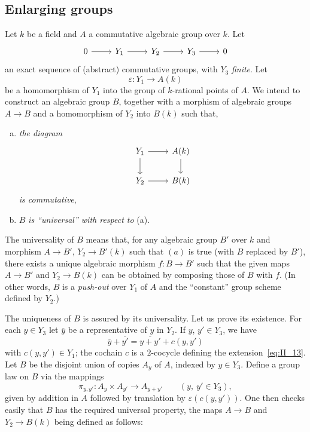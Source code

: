\subsection{Enlarging groups}
\label{sec:II_13}
Let $k$ be a field and $A$ a commutative algebraic group over $k$. Let
\begin{equation}\label{eq:II_13}
	\begin{tikzcd}
		0 \arrow[r] & Y_1 \arrow[r] & Y_2 \arrow[r] & Y_3 \arrow[r] & 0
	\end{tikzcd}
\end{equation}
an exact sequence of (abstract) commutative groups, with $Y_3$ \emph{finite}.
Let
\[
\varepsilon : Y_1 \rightarrow A(k)
\]
be a homomorphism of $Y_1$ into the group of $k$-rational points of $A$. We 
intend to construct an algebraic group $B$, together with a morphism of 
algebraic groups $A \to B$ and a homomorphism of $Y_2$ into $B(k)$ such that,
\begin{enumerate}[(a)]
	\item \emph{the diagram}
	\[
		\begin{tikzcd}
			Y_1 \arrow[r] \arrow[d] & A(k) \arrow[d] \\
			Y_2 \arrow[r] & B(k)
		\end{tikzcd}
	\]
	\emph{is commutative},
	\item $B$ \emph{is ``universal'' with respect to} (a).
\end{enumerate}
The universality of $B$ means that, for any algebraic group $B'$ over $k$ and 
morphism $A \to B'$, $Y_2 \to B'(k)$ such that $(a)$ is true (with $B$ replaced 
by $B'$), there exists a unique algebraic morphism $f:B \to B'$ such that the 
given maps $A \to B'$ and $Y_2 \to B(k)$ can
\dpage
be obtained by composing those of $B$ with $f$. (In other words, $B$ is a \emph
{push-out} over $Y_1$ of $A$ and the ``constant'' group scheme defined by 
$Y_2$.)

The uniqueness of $B$ is assured by its universality. Let us prove its 
existence. For each $y \in Y_3$ let $\overline{y}$ be a representative of $y$
in 
$Y_2$. If $y$, $y' \in Y_3$, we have
\[
\overline{y} + \overline{y'} = \overline{y + y'} + c(y, y')
\]
with $c(y, y') \in Y_1$; the cochain $c$ is a $2$-cocycle defining the 
extension~\eqref{eq:II_13}. Let $B$ be the disjoint union of copies $A_y$ of $A$, 
indexed by $y \in Y_3$. Define a group law on $B$ via the mappings
\[
\pi_{y, y'} : A_y \times A_{y'} \rightarrow A_{y + y'} \qquad (y,~y' \in Y_3),
\]
given by addition in $A$ followed by translation by $\varepsilon(c(y,y'))$. One 
then checks easily that $B$ has the required universal  property, the maps $A 
\to B$ and $Y_2 \to B(k)$ being defined as follows:


